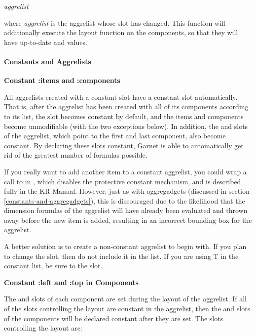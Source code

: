  {\it aggrelist}\value{method}

where {\it aggrelist} is the aggrelist whose  slot has changed.
This function will additionally execute the layout function on the components,
so that they will have up-to-date  and  values.


\paragraph{Constants and Aggrelists}
\label{constants-in-aggrelists}

\vspace{1 line}
{\bf Constant :items and :components}

All aggrelists created with a constant  slot have a constant
 slot automatically.  That is, after the
aggrelist has been created with all of its components according to its
 list, the  slot becomes constant by
default, and the items and components become unmodifiable (with the
two exceptions below).  In addition, the  and 
slots of the aggrelist, which point to the first and last component,
also become constant.  By declaring these slots constant, Garnet is
able to automatically get rid of the greatest number of formulas possible.

If you really want to add another item to a constant aggrelist, you
could wrap a call to  in ,
which disables the protective constant mechanism, and is described
fully in the KR Manual.  However, just as with aggregadgets (discussed
in section \ref{constants-and-aggregadgets}), this is discouraged
due to the likelihood that the dimension formulas of the aggrelist
will have already been evaluated and thrown away before the new item
is added, resulting in an incorrect bounding box for the aggrelist.

A better solution is to create a non-constant aggrelist to begin with.
If you plan to change the  slot, then do not include it in the
 list.  If you are using T in the constant list, be sure
to  the  slot.

\vspace{2 lines}
{\bf Constant :left and :top in Components}

The  and  slots of each component are set during the
layout of the aggrelist.  If all of the slots controlling the layout are
constant in the aggrelist, then the  and  slots of the
components will be declared constant after they are set.  The slots controlling
the layout are:

